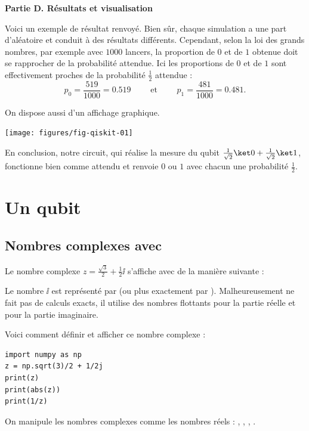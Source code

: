 \documentclass[11pt,class=report,crop=false]{standalone}
\begin{document}
\bigskip
\textbf{Partie D. Résultats et visualisation}

Voici un exemple de résultat renvoyé.
Bien sûr, chaque simulation a une part d'aléatoire et conduit à des résultats différents.
Cependant, selon la loi des grands nombres, par exemple avec $1000$ lancers, la proportion de $0$ et de $1$ obtenue doit se rapprocher de la probabilité attendue.
Ici les proportions de $0$ et de $1$ sont effectivement proches de la probabilité $\frac12$ attendue :
$$p_0 = \frac{519}{1000}=0.519 \qquad \text{ et } \qquad p_1 = \frac{481}{1000} = 0.481.$$

On dispose aussi d'un affichage graphique.
\begin{center}
\texttt{[image: figures/fig-qiskit-01]}
\end{center}

En conclusion, notre circuit, qui réalise la mesure du qubit $\frac1{\sqrt2}\ket0 + \frac1{\sqrt2}\ket1$, fonctionne bien comme attendu et renvoie $0$ ou $1$ avec chacun une probabilité $\frac12$.


\section{Un qubit}


\subsection{Nombres complexes avec \Python}

Le nombre complexe $z =\frac{\sqrt3}{2} + \frac12\ii$ s'affiche avec \Python{} de la manière suivante :

Le nombre $\ii$ est représenté par  (ou plus exactement par ). Malheureusement \Python{} ne fait pas de calculs exacts, il utilise des nombres flottants pour la partie réelle et pour la partie imaginaire.

Voici comment définir et afficher ce nombre complexe :
\begin{lstlisting}
import numpy as np
z = np.sqrt(3)/2 + 1/2j
print(z)
print(abs(z))
print(1/z)
\end{lstlisting}
On manipule les nombres complexes comme les nombres réels : ,
, , .
\end{document}
